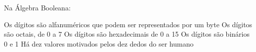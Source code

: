 \documentclass[12pt, addpoints]{exam}
\begin{document}
    \begin{questions}

    \newpage
    \question
Na Álgebra Booleana:
\begin{choices}
\choice Os dígitos são alfanuméricos que podem ser representados por um byte
\choice Os dígitos são octais, de 0 a 7
\choice Os dígitos são hexadecimais de 0 a 15
\choice Os dígitos são binários 0 e 1
\choice Há dez valores motivados pelos dez dedos do ser humano
\end{choices}



    \end{questions}
    
\end{document}
